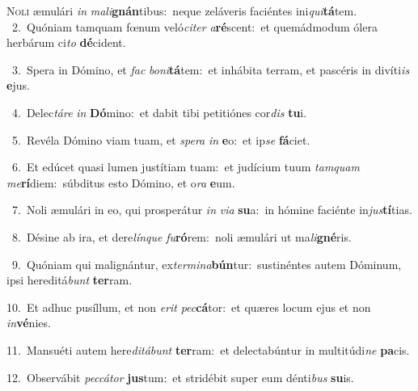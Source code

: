 \lettrine{\initial\textcolor{\initialcolor}{N}}{oli} æmulári \textit{in} \textit{ma}\-\textit{li}\textbf{gnán}tibus:~\star neque zeláveris faciéntes ini\-\textit{qui}\-\textbf{tá}tem.\\
{\numbfont\textcolor{\numbcolor}{~2.}}~Quóniam tamquam fœnum veló\-\textit{ci}\-\textit{ter} \textit{a}\-\textbf{ré}scent:~\star et quemádmodum ólera herbárum ci\textit{to} \textbf{dé}\-cident.\par
{\numbfont\textcolor{\numbcolor}{~3.}}~Spera in Dómino, et \textit{fac} \textit{bo}\-\textit{ni}\textbf{tá}tem:~\star et inhábita terram, et pascéris in divíti\textit{is} \textbf{e}\-jus.\par
{\numbfont\textcolor{\numbcolor}{~4.}}~Delec\-\textit{tá}\-\textit{re} \textit{in} \textbf{Dó}\-mino:~\star et dabit tibi petitiónes cor\textit{dis} \textbf{tu}\-i.\par
{\numbfont\textcolor{\numbcolor}{~5.}}~Revéla Dómino viam tuam, et \textit{spe}\-\textit{ra} \textit{in} \textbf{e}\-o:~\star et ip\textit{se} \textbf{fá}\-ciet.\par
{\numbfont\textcolor{\numbcolor}{~6.}}~Et edúcet quasi lumen justítiam tuam:~\dagger et judícium tuum \textit{tam}\-\textit{quam} \textit{me}\-\textbf{rí}diem:~\star súbditus esto Dómino, et o\textit{ra} \textbf{e}\-um.\par
{\numbfont\textcolor{\numbcolor}{~7.}}~Noli æmulári in eo, qui prosperátur \textit{in} \textit{vi}\-\textit{a} \textbf{su}\-a:~\star in hómine faciénte in\-\textit{jus}\-\textbf{tí}tias.\par
{\numbfont\textcolor{\numbcolor}{~8.}}~Désine ab ira, et dere\-\textit{lín}\-\textit{que} \textit{fu}\-\textbf{ró}rem:~\star noli æmulári ut ma\-\textit{li}\-\textbf{gné}ris.\par
{\numbfont\textcolor{\numbcolor}{~9.}}~Quóniam qui malignántur, ex\-\textit{ter}\-\textit{mi}\textit{na}\textbf{bún}tur:~\star sustinéntes autem Dóminum, ipsi hereditá\textit{bunt} \textbf{ter}\-ram.\par
{\numbfont\textcolor{\numbcolor}{10.}}~Et adhuc pusíllum, et non \textit{e}\-\textit{rit} \textit{pec}\-\textbf{cá}tor:~\star et quæres locum ejus et non \textit{in}\-\textbf{vé}nies.\par
{\numbfont\textcolor{\numbcolor}{11.}}~Mansuéti autem here\-\textit{di}\-\textit{tá}\textit{bunt} \textbf{ter}\-ram:~\star et delectabúntur in multitúdi\textit{ne} \textbf{pa}\-cis.\par
{\numbfont\textcolor{\numbcolor}{12.}}~Observábit \textit{pec}\-\textit{cá}\textit{tor} \textbf{jus}\-tum:~\star et stridébit super eum dénti\textit{bus} \textbf{su}\-is.\par
